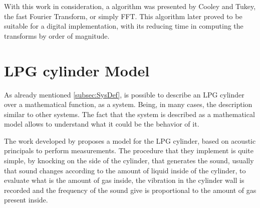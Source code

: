 With this work in consideration, a algorithm was presented by Cooley and Tukey, the fast Fourier Transform, or simply FFT. This algorithm later proved to be suitable for a digital implementation, with its reducing time in computing the transforms by order of magnitude.\cite{oppenheimSignalsSystems1997}



\section{LPG cylinder Model}\label{sec:LPGModel}
As already mentioned \ref{subsec:SysDef}, is possible to describe an LPG cylinder over a mathematical function, as a system. Being, in many cases, the description similar to other systems. The fact that the system is described as a mathematical model allows to understand what it could be the behavior of it. 

The work developed by \citeauthor{wuLiquidLevelDetector2014b} proposes a model for the LPG cylinder, based on acoustic principals to perform measurements. The procedure that they implement is quite simple, by knocking on the side of the cylinder, that generates the sound, usually that sound changes according to the amount of liquid inside of the cylinder, to evaluate what is the amount of gas inside, the vibration in the cylinder wall is recorded and the frequency of the sound give is proportional to the amount of gas present inside.

